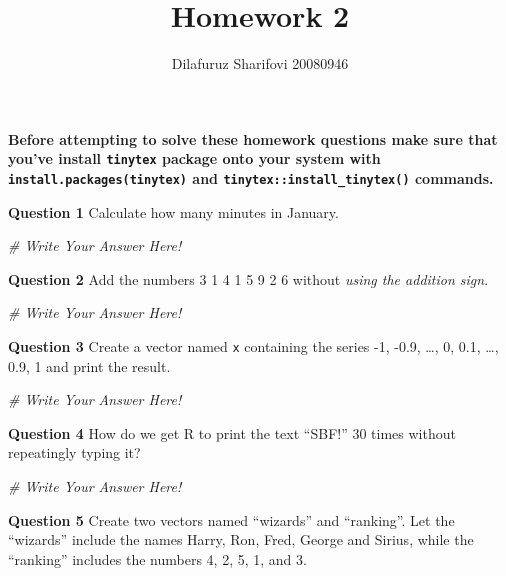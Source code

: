 \documentclass[
]{article}
\title{Homework 2}
\author{Dilafuruz Sharifovi 20080946}
\date{}
\newenvironment{Shaded}{\begin{snugshade}}{\end{snugshade}}
\newcommand{\CommentTok}[1]{\textcolor[rgb]{0.56,0.35,0.01}{\textit{#1}}}
\begin{document}
\maketitle

\textbf{Before attempting to solve these homework questions make sure
that you've install \texttt{tinytex} package onto your system with
\texttt{install.packages(tinytex)} and
\texttt{tinytex::install\_tinytex()} commands.}

\vspace{1cm}

\textbf{Question 1} Calculate how many minutes in January.

\begin{Shaded}
\begin{Highlighting}[]
\CommentTok{\# Write Your Answer Here!}
\end{Highlighting}
\end{Shaded}

\textbf{Question 2} Add the numbers 3 1 4 1 5 9 2 6 without \emph{using
the addition sign}.

\begin{Shaded}
\begin{Highlighting}[]
\CommentTok{\# Write Your Answer Here!}
\end{Highlighting}
\end{Shaded}

\textbf{Question 3} Create a vector named \texttt{x} containing the
series -1, -0.9, \ldots, 0, 0.1, \ldots, 0.9, 1 and print the result.

\begin{Shaded}
\begin{Highlighting}[]
\CommentTok{\# Write Your Answer Here!}
\end{Highlighting}
\end{Shaded}

\textbf{Question 4} How do we get R to print the text ``SBF!'' 30 times
without repeatingly typing it?

\begin{Shaded}
\begin{Highlighting}[]
\CommentTok{\# Write Your Answer Here!}
\end{Highlighting}
\end{Shaded}

\textbf{Question 5} Create two vectors named ``wizards'' and
``ranking''. Let the ``wizards'' include the names Harry, Ron, Fred,
George and Sirius, while the ``ranking'' includes the numbers 4, 2, 5,
1, and 3.
\end{document}
